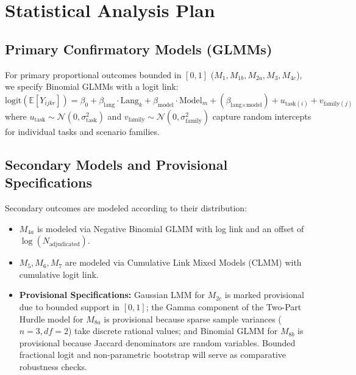 \documentclass[11pt,a4paper]{article}
\begin{document}
\section{Statistical Analysis Plan}
\label{sec:sap}

\subsection{Primary Confirmatory Models (GLMMs)}
\label{sec:primary_models}

For primary proportional outcomes bounded in $[0, 1]$ ($M_1, M_{1b}, M_{2a}, M_3, M_{4c}$), we specify Binomial GLMMs with a logit link:
\begin{equation}
\label{eq:glmm}
\text{logit}(\mathbb{E}[Y_{ijkr}]) = \beta_0 + \beta_{\text{lang}} \cdot \text{Lang}_{k} + \beta_{\text{model}} \cdot \text{Model}_{m} + (\beta_{\text{lang} \times \text{model}}) + u_{\text{task}(i)} + v_{\text{family}(j)}
\end{equation}
where $u_{\text{task}} \sim \mathcal{N}(0, \sigma_{\text{task}}^2)$ and $v_{\text{family}} \sim \mathcal{N}(0, \sigma_{\text{family}}^2)$ capture random intercepts for individual tasks and scenario families.

\subsection{Secondary Models and Provisional Specifications}
\label{sec:secondary_models}

Secondary outcomes are modeled according to their distribution:
\begin{itemize}
  \item $M_{4a}$ is modeled via Negative Binomial GLMM with log link and an offset of $\log(N_{\text{adjudicated}})$.
  \item $M_5, M_6, M_7$ are modeled via Cumulative Link Mixed Models (CLMM) with cumulative logit link.
  \item \textbf{Provisional Specifications:} Gaussian LMM for $M_{2c}$ is marked provisional due to bounded support in $[0, 1]$; the Gamma component of the Two-Part Hurdle model for $M_{8a}$ is provisional because sparse sample variances ($n=3, df=2$) take discrete rational values; and Binomial GLMM for $M_{8b}$ is provisional because Jaccard denominators are random variables. Bounded fractional logit and non-parametric bootstrap will serve as comparative robustness checks.
\end{itemize}
\end{document}
